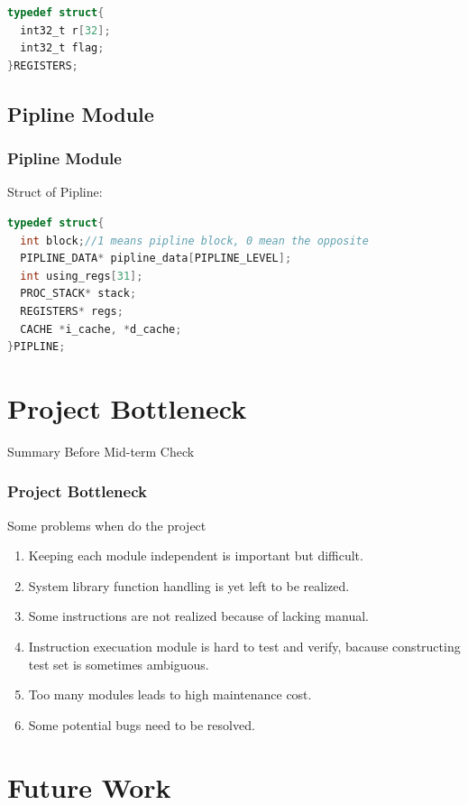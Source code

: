 \documentclass[CJK]{beamer}
\begin{document}
\begin{CJK}{UTF8}{gbsn}
\begin{frame}[fragile]
\begin{lstlisting}[language={C}]
typedef struct{
  int32_t r[32];
  int32_t flag;
}REGISTERS;
\end{lstlisting}
\end{frame}

\subsection{Pipline Module}
\begin{frame}[fragile]
  \frametitle{Pipline Module}
  Struct of Pipline:
\begin{lstlisting}[language={C}]
typedef struct{
  int block;//1 means pipline block, 0 mean the opposite
  PIPLINE_DATA* pipline_data[PIPLINE_LEVEL];
  int using_regs[31];
  PROC_STACK* stack;
  REGISTERS* regs;
  CACHE *i_cache, *d_cache;
}PIPLINE;
\end{lstlisting}
\end{frame}

\section{Project Bottleneck}

\begin{frame}
  \huge{Summary Before Mid-term Check}
\end{frame}

\begin{frame}
  \frametitle{Project Bottleneck}
  Some problems when do the project
  \begin{enumerate}
    \item Keeping each module independent is important but difficult.
    \item System library function handling is yet left to be realized.
    \item Some instructions are not realized because of lacking manual.
    \item Instruction execuation module is hard to test and verify, bacause constructing test set is sometimes ambiguous.
    \item Too many modules leads to high maintenance cost.
    \item Some potential bugs need to be resolved.
  \end{enumerate}
\end{frame}

\section{Future Work}


\end{CJK}
\end{document}
